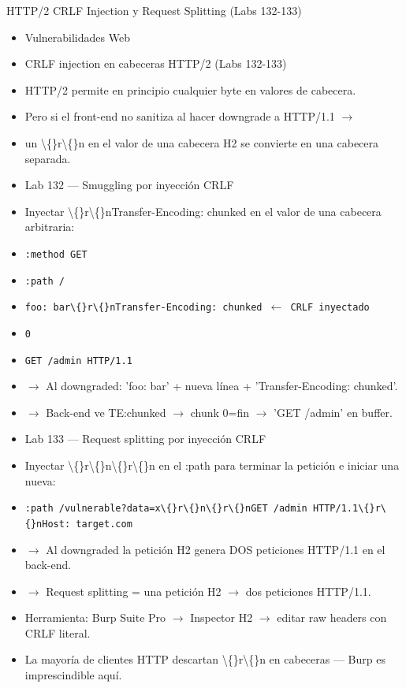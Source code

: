 \documentclass[aspectratio=169,10pt]{beamer}
\newcommand{\cmd}[1]{\texttt{\color{uznavy}#1}}
\begin{document}
\begin{frame}[allowframebreaks]{HTTP/2 CRLF Injection y Request Splitting (Labs 132-133)}
\small
  \begin{itemize}
  \item Vulnerabilidades Web
  \item CRLF injection en cabeceras HTTP/2 (Labs 132-133)
  \item HTTP/2 permite en principio cualquier byte en valores de cabecera.
  \item Pero si el front-end no sanitiza al hacer downgrade a HTTP/1.1 $\rightarrow$
  \item un \textbackslash\{\}r\textbackslash\{\}n en el valor de una cabecera H2 se convierte en una cabecera separada.
  \item Lab 132 --- Smuggling por inyección CRLF
  \item Inyectar \textbackslash\{\}r\textbackslash\{\}nTransfer-Encoding: chunked en el valor de una cabecera arbitraria:
  \item \cmd{:method GET}
  \item \cmd{:path /}
  \item \cmd{foo: bar\textbackslash\{\}r\textbackslash\{\}nTransfer-Encoding: chunked $\leftarrow$ CRLF inyectado}
  \item \cmd{0}
  \item \cmd{GET /admin HTTP/1.1}
  \item $\rightarrow$ Al downgraded: 'foo: bar' + nueva línea + 'Transfer-Encoding: chunked'.
  \item $\rightarrow$ Back-end ve TE:chunked $\rightarrow$ chunk 0=fin $\rightarrow$ 'GET /admin' en buffer.
  \item Lab 133 --- Request splitting por inyección CRLF
  \item Inyectar \textbackslash\{\}r\textbackslash\{\}n\textbackslash\{\}r\textbackslash\{\}n en el :path para terminar la petición e iniciar una nueva:
  \item \cmd{:path /vulnerable?data=x\textbackslash\{\}r\textbackslash\{\}n\textbackslash\{\}r\textbackslash\{\}nGET /admin HTTP/1.1\textbackslash\{\}r\textbackslash\{\}nHost: target.com}
  \item $\rightarrow$ Al downgraded la petición H2 genera DOS peticiones HTTP/1.1 en el back-end.
  \item $\rightarrow$ Request splitting = una petición H2 $\rightarrow$ dos peticiones HTTP/1.1.
  \item Herramienta: Burp Suite Pro $\rightarrow$ Inspector H2 $\rightarrow$ editar raw headers con CRLF literal.
  \item La mayoría de clientes HTTP descartan \textbackslash\{\}r\textbackslash\{\}n en cabeceras --- Burp es imprescindible aquí.
  \end{itemize}
\end{frame}
\end{document}
